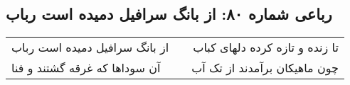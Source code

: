\begin{center}
\section*{رباعی شماره ۸۰: از بانگ سرافیل دمیده است رباب}
\label{sec:0080}
\begin{longtable}{l p{0.5cm} r}
از بانگ سرافیل دمیده است رباب
&&
تا زنده و تازه کرده دلهای کباب
\\
آن سوداها که غرقه گشتند و فنا
&&
چون ماهیکان برآمدند از تک آب
\\
\end{longtable}
\end{center}
